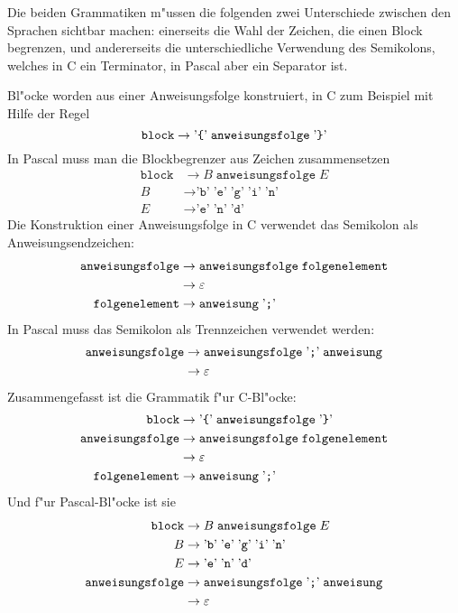 \begin{loesung}
Die beiden Grammatiken m"ussen die folgenden zwei Unterschiede zwischen
den Sprachen sichtbar machen: einerseits die Wahl der Zeichen,
die einen Block begrenzen, und andererseits die unterschiedliche
Verwendung des Semikolons, welches
in C ein Terminator, in Pascal aber ein Separator ist.

Bl"ocke worden aus einer Anweisungsfolge konstruiert, in C zum Beispiel
mit Hilfe der Regel
\[
\texttt{block}
\rightarrow
\text{'{\tt \{}'}\;\texttt{anweisungsfolge}\; \text{'{\tt\}}'}
\]
In Pascal muss man die Blockbegrenzer aus Zeichen zusammensetzen
\begin{align*}
\texttt{block}
&\rightarrow
B\; \texttt{anweisungsfolge}\;E
\\
B&\rightarrow
\text{'}\texttt{b}\text{'}\;
\text{'}\texttt{e}\text{'}\;
\text{'}\texttt{g}\text{'}\;
\text{'}\texttt{i}\text{'}\;
\text{'}\texttt{n}\text{'}
\\
E&\rightarrow
\text{'}\texttt{e}\text{'}\;
\text{'}\texttt{n}\text{'}\;
\text{'}\texttt{d}\text{'}
\end{align*}
Die Konstruktion einer Anweisungsfolge in C verwendet das Semikolon als
Anweisungsendzeichen:
\begin{align*}
\texttt{anweisungsfolge}
&\rightarrow
\texttt{anweisungsfolge}
\;
\texttt{folgenelement}
\\
&\rightarrow\varepsilon
\\
\texttt{folgenelement}
&\rightarrow 
\texttt{anweisung}
\;\text{'{\tt ;}'}
\end{align*}
In Pascal muss das Semikolon als Trennzeichen verwendet werden:
\begin{align*}
\texttt{anweisungsfolge}
&\rightarrow
\texttt{anweisungsfolge} \; \text{'{\tt ;}'}\; \texttt{anweisung}
\\
&\rightarrow\varepsilon
\end{align*}
Zusammengefasst ist die Grammatik f"ur C-Bl"ocke:
\begin{align*}
\texttt{block}
&\rightarrow
\text{'{\tt \{}'}\;\texttt{anweisungsfolge}\; \text{'{\tt\}}'}
\\
\texttt{anweisungsfolge}
&\rightarrow
\texttt{anweisungsfolge}
\;
\texttt{folgenelement}
\\
&\rightarrow\varepsilon
\\
\texttt{folgenelement}
&\rightarrow 
\texttt{anweisung}
\;\text{'{\tt ;}'}
\end{align*}
Und f"ur Pascal-Bl"ocke ist sie
\begin{align*}
\texttt{block}
&\rightarrow
B\; \texttt{anweisungsfolge}\;E
\\
B&\rightarrow
\text{'}\texttt{b}\text{'}\;
\text{'}\texttt{e}\text{'}\;
\text{'}\texttt{g}\text{'}\;
\text{'}\texttt{i}\text{'}\;
\text{'}\texttt{n}\text{'}
\\
E&\rightarrow
\text{'}\texttt{e}\text{'}\;
\text{'}\texttt{n}\text{'}\;
\text{'}\texttt{d}\text{'}
\\
\texttt{anweisungsfolge}
&\rightarrow
\texttt{anweisungsfolge} \; \text{'{\tt ;}'}\; \texttt{anweisung}
\\
&\rightarrow\varepsilon
\end{align*}
\end{loesung}

